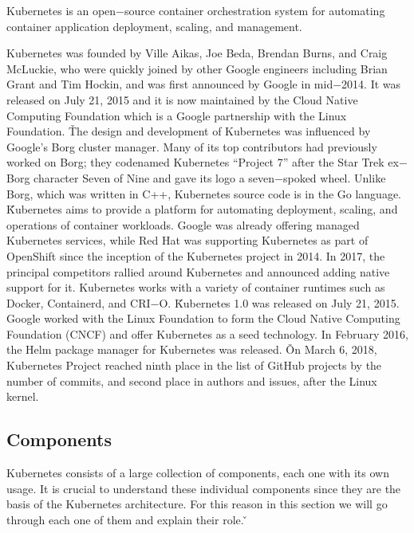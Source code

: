 \bd[Kubernetes]
Kubernetes is an open$-$source container orchestration system for automating container application deployment, scaling,
and management.
\ed

Kubernetes was founded by Ville Aikas, Joe Beda, Brendan Burns, and Craig McLuckie, who were quickly joined by other
Google engineers including Brian Grant and Tim Hockin, and was first announced by Google in mid$-$2014. It was
released on July 21, 2015 and it is now maintained by the Cloud Native Computing Foundation which is a Google
partnership with the Linux Foundation. \v

The design and development of Kubernetes was influenced by Google's Borg cluster manager. Many of its top
contributors had previously worked on Borg; they codenamed Kubernetes ``Project 7'' after the Star Trek ex$-$Borg
character Seven of Nine and gave its logo a seven$-$spoked wheel. Unlike Borg, which was written in C++, Kubernetes
source code is in the Go language. \v

Kubernetes aims to provide a platform for automating deployment, scaling, and operations of container workloads.
Google was already offering managed Kubernetes services, while Red Hat was supporting Kubernetes as part of OpenShift
since the inception of the Kubernetes project in 2014. In 2017, the principal competitors rallied around Kubernetes
and announced adding native support for it. Kubernetes works with a variety of container runtimes such as Docker,
Containerd, and CRI$-$O. \v

Kubernetes 1.0 was released on July 21, 2015. Google worked with the Linux Foundation to form the Cloud Native
Computing Foundation (CNCF) and offer Kubernetes as a seed technology. In February 2016, the Helm package manager for
Kubernetes was released. \v

On March 6, 2018, Kubernetes Project reached ninth place in the list of GitHub projects by the number of commits, and
second place in authors and issues, after the Linux kernel.

\subsection{Components}

Kubernetes consists of a large collection of components, each one with its own usage. It is crucial to understand
these individual components since they are the basis of the Kubernetes architecture. For this reason in this section
we will go through each one of them and explain their role. \v


